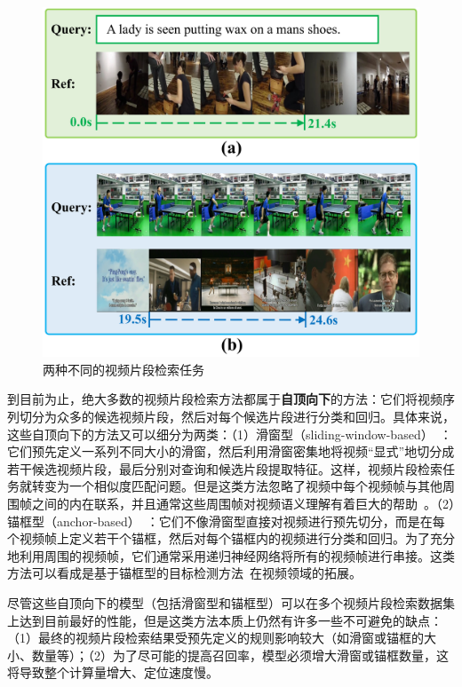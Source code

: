 \begin{figure}[t]
    \centering
    \includegraphics[width=0.8\linewidth]{chapter6/res/qbvl.pdf}
    \caption{两种不同的视频片段检索任务}
    \label{ch6:fig:qbvl}
\end{figure}

到目前为止，绝大多数的视频片段检索方法都属于\textbf{自顶向下}的方法：它们将视频序列切分为众多的候选视频片段，然后对每个候选片段进行分类和回归。具体来说，这些自顶向下的方法又可以细分为两类：（1）滑窗型（sliding-window-based）~\cite{gao2017tall,anne2017localizing,liu2018attentive,liu2018cross,ge2019mac,chen2019semantic,xu2019multilevel,zhang2019exploiting}：它们预先定义一系列不同大小的滑窗，然后利用滑窗密集地将视频“显式”地切分成若干候选视频片段，最后分别对查询和候选片段提取特征。这样，视频片段检索任务就转变为一个相似度匹配问题。但是这类方法忽略了视频中每个视频帧与其他周围帧之间的内在联系，并且通常这些周围帧对视频语义理解有着巨大的帮助~\cite{wu2019long}。（2）锚框型（anchor-based）~\cite{chen2018temporally,zhang2019man}：它们不像滑窗型直接对视频进行预先切分，而是在每个视频帧上定义若干个锚框，然后对每个锚框内的视频进行分类和回归。为了充分地利用周围的视频帧，它们通常采用递归神经网络将所有的视频帧进行串接。这类方法可以看成是基于锚框型的目标检测方法~\cite{ren2015faster}在视频领域的拓展。

尽管这些自顶向下的模型（包括滑窗型和锚框型）可以在多个视频片段检索数据集上达到目前最好的性能，但是这类方法本质上仍然有许多一些不可避免的缺点：（1）最终的视频片段检索结果受预先定义的规则影响较大（如滑窗或锚框的大小、数量等）；（2）为了尽可能的提高召回率，模型必须增大滑窗或锚框数量，这将导致整个计算量增大、定位速度慢。


